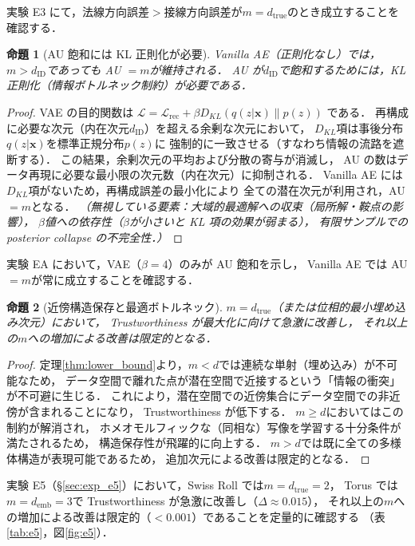 \documentclass[12pt,a4paper]{jsarticle}
\newtheorem{proposition}{命題}
\newcommand{\dID}{d_{\mathrm{ID}}}
\newcommand{\dtrue}{d_{\mathrm{true}}}
\newcommand{\demb}{d_{\mathrm{emb}}}
\begin{document}
実験 E3 にて，法線方向誤差$>$接線方向誤差が$m = \dtrue$のとき成立することを確認する．

\begin{proposition}[AU 飽和には KL 正則化が必要]\label{thm:au}
Vanilla AE（正則化なし）では，$m > \dID$であっても AU $= m$が維持される．
AU が$\dID$で飽和するためには，KL 正則化（情報ボトルネック制約）が必要である．
\end{proposition}
\begin{proof}
VAE の目的関数は
$\mathcal{L} = \mathcal{L}_{\mathrm{rec}} + \beta D_{KL}(q(z|\boldsymbol{x})\|p(z))$
である．
再構成に必要な次元（内在次元$\dID$）を超える余剰な次元において，
$D_{KL}$項は事後分布$q(z|\boldsymbol{x})$を標準正規分布$p(z)$に
強制的に一致させる（すなわち情報の流路を遮断する）．
この結果，余剰次元の平均および分散の寄与が消滅し，
AU の数はデータ再現に必要な最小限の次元数（内在次元）に抑制される．
Vanilla AE には$D_{KL}$項がないため，再構成誤差の最小化により
全ての潜在次元が利用され，AU $= m$となる．
\textit{（無視している要素：大域的最適解への収束（局所解・鞍点の影響），
$\beta$値への依存性（$\beta$が小さいと KL 項の効果が弱まる），
有限サンプルでの posterior collapse の不完全性．）}
\end{proof}

実験 EA において，VAE（$\beta = 4$）のみが AU 飽和を示し，
Vanilla AE では AU $= m$が常に成立することを確認する．

\begin{proposition}[近傍構造保存と最適ボトルネック]\label{thm:trust}
$m = \dtrue$（または位相的最小埋め込み次元）において，
Trustworthiness が最大化に向けて急激に改善し，
それ以上の$m$への増加による改善は限定的となる．
\end{proposition}
\begin{proof}
定理\ref{thm:lower_bound}より，$m < d$では連続な単射（埋め込み）が不可能なため，
データ空間で離れた点が潜在空間で近接するという「情報の衝突」が不可避に生じる．
これにより，潜在空間での近傍集合にデータ空間での非近傍が含まれることになり，
Trustworthiness が低下する．
$m \geq d$においてはこの制約が解消され，
ホメオモルフィックな（同相な）写像を学習する十分条件が満たされるため，
構造保存性が飛躍的に向上する．
$m > d$では既に全ての多様体構造が表現可能であるため，
追加次元による改善は限定的となる．
\end{proof}

実験 E5（§\ref{sec:exp_e5}）において，Swiss Roll では$m = \dtrue = 2$，
Torus では$m = \demb = 3$で Trustworthiness が急激に改善し（$\Delta \approx 0.015$），
それ以上の$m$への増加による改善は限定的（$<0.001$）であることを定量的に確認する
（表\ref{tab:e5}，図\ref{fig:e5}）．
\end{document}
